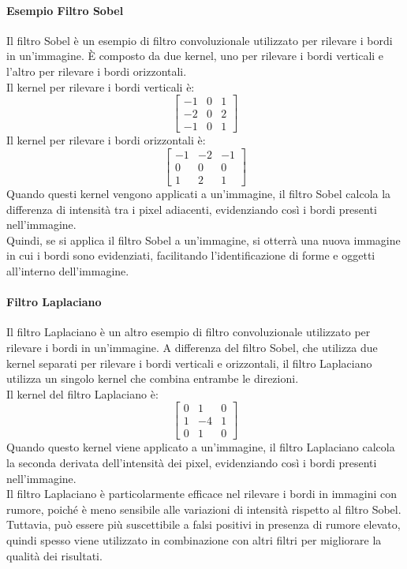 \paragraph{Esempio Filtro Sobel}
Il filtro Sobel è un esempio di filtro convoluzionale utilizzato per rilevare i bordi in un'immagine. È composto da due kernel, uno per rilevare i bordi verticali e l'altro per rilevare i bordi orizzontali.\\
Il kernel per rilevare i bordi verticali è:
$$\begin{bmatrix}-1 & 0 & 1 \\
-2 & 0 & 2 \\
-1 & 0 & 1\end{bmatrix}$$
Il kernel per rilevare i bordi orizzontali è:   
$$\begin{bmatrix}-1 & -2 & -1 \\
0 & 0 & 0 \\
1 & 2 & 1\end{bmatrix}$$
Quando questi kernel vengono applicati a un'immagine, il filtro Sobel calcola la differenza di intensità tra i pixel adiacenti, evidenziando così i bordi presenti nell'immagine.\\
Quindi, se si applica il filtro Sobel a un'immagine, si otterrà una nuova immagine in cui i bordi sono evidenziati, facilitando l'identificazione di forme e oggetti all'interno dell'immagine.\\

\paragraph{Filtro Laplaciano}
Il filtro Laplaciano è un altro esempio di filtro convoluzionale utilizzato per rilevare i bordi in un'immagine. A differenza del filtro Sobel, che utilizza due kernel separati per rilevare i bordi verticali e orizzontali, il filtro Laplaciano utilizza un singolo kernel che combina entrambe le direzioni.\\
Il kernel del filtro Laplaciano è:
$$\begin{bmatrix}0 & 1 & 0 \\
1 & -4 & 1 \\
0 & 1 & 0\end{bmatrix}$$
Quando questo kernel viene applicato a un'immagine, il filtro Laplaciano calcola la seconda derivata dell'intensità dei pixel, evidenziando così i bordi presenti nell'immagine.\\
Il filtro Laplaciano è particolarmente efficace nel rilevare i bordi in immagini con rumore, poiché è meno sensibile alle variazioni di intensità rispetto al filtro Sobel. Tuttavia, può essere più suscettibile a falsi positivi in presenza di rumore elevato, quindi spesso viene utilizzato in combinazione con altri filtri per migliorare la qualità dei risultati.\\

